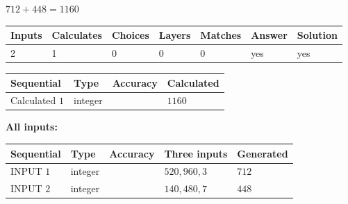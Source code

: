 \documentclass{ctexart}
\begin{document}
 

$ %
712 +  %
448=   %
1160$
 
 
\noindent{}
 
 

 
   
   
   
   
\noindent\begin{tabular}{|l|l|l|l|l|l|l|}
 \hline
Inputs & Calculates & Choices & Layers & Matches & Answer & Solution \\ \hline
 2  & 
 1  & 
 0
  & 
 0  & 
 0  & 
  yes & 
  yes 
  \\ \hline
 \end{tabular}
   
   
   
   
\noindent{}
   
   
  
  
\noindent\begin{tabular}{|l|l|l|l|}
\hline
 Sequential & Type & Accuracy & Calculated \\ 
\hline
 
 
  Calculated $  1 $ & integer &  & 
  $ 1160 $ 
 \\  \hline  
 \end{tabular}
   
   
   
   
\noindent\vspace{0.1in}\hspace{-0.08in} {\textbf{\Large{All inputs: }}}
   
   
  
  
\noindent\begin{tabular}{|l|l|l|l|l|}
\hline
 Sequential & Type & Accuracy & Three inputs & Generated \\ 
\hline
 
 
  INPUT $  1 $ & integer &  & $
 520
 , 
 960
 , 
 3
 $ & $ 712 $ 
 \\  \hline  
 
 
  INPUT $  2 $ & integer &  & $
 140
 , 
 480
 , 
 7
 $ & $ 448 $ 
 \\  \hline  
 \end{tabular}
   
   
   
   
   
   
 \vspace{0.2in}
 
\end{document}
